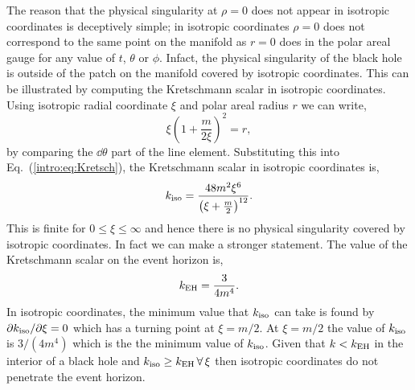 The reason that the physical singularity at $\rho=0$ does not appear in isotropic coordinates is deceptively simple; in isotropic coordinates $\rho=0$ does not correspond to the same point on the manifold as $r=0$ does in the polar areal gauge for any value of $t$, $\theta$ or $\phi$. Infact, the physical singularity of the black hole is outside of the patch on the manifold covered by isotropic coordinates. This can be illustrated by computing the Kretschmann scalar in isotropic coordinates. Using isotropic radial coordinate $\xi$ and polar areal radius $r$ we can write,
\begin{equation}
\xi \left(1 +\frac{m}{2\xi} \right)^2 = r,
\end{equation}
by comparing the $\dd\theta$ part of the line element. Substituting this into Eq.~(\ref{intro:eq:Kretsch}), the Kretschmann scalar in isotropic coordinates is,
\begin{equation}
k_{\rm iso} =  \frac{48 m^2\xi^6}{\left(\xi + \frac{m}{2} \right)^{12}}.
\end{equation}
This is finite for $0\leq \xi \leq \infty$ and hence there is no physical singularity covered by isotropic coordinates. In fact we can make a stronger statement. The value of the Kretschmann scalar on the event horizon is,
\begin{equation}
k_{\rm EH} = \frac{3}{4 m^4}.
\end{equation}
In isotropic coordinates, the minimum value that $k_{\rm iso}$ can take is found by $\partial k_{\rm iso} / \partial \xi =0 $ which has a turning point at $\xi = m/2$. At $\xi = m/2$ the value of $k_{\rm iso}$ is $3/(4m^4)$ which is the the minimum value of $k_{\rm iso}$. Given that $k<k_{\rm EH}$ in the interior of a black hole and $k_{\rm iso}\geq k_{\rm EH} \,\forall\, \xi$ then isotropic coordinates do not penetrate the event horizon.    







